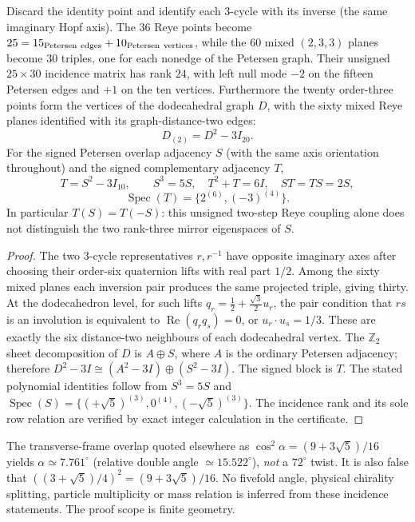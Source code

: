 \documentclass[11pt]{article}
\begin{document}
\begin{corollary}
\label{p1:cor:v340-reye-dodeca-second-neighbour}
Discard the identity point and identify each 3-cycle with its inverse
(the same imaginary Hopf axis). The 36 Reye points become
$25=15_{\rm Petersen\ edges}+10_{\rm Petersen\ vertices}$,
while the $60$ mixed $(2,3,3)$ planes become $30$ triples, one for
each nonedge of the Petersen graph. Their unsigned $25\times30$
incidence matrix has rank $24$, with left null mode $-2$ on the
fifteen Petersen edges and $+1$ on the ten vertices.
Furthermore the twenty order-three points form the vertices of the
dodecahedral graph $D$, with the sixty mixed Reye planes identified
with its graph-distance-two edges:
\[
 \boxed{D_{(2)}=D^2-3I_{20}.}
\]
For the signed Petersen overlap adjacency $S$ (with the same axis
orientation throughout) and the signed complementary adjacency $T$,
\[
 \boxed{T=S^2-3I_{10}},\qquad
 S^3=5S,\quad T^2+T=6I,\quad ST=TS=2S,
\]
\[
 \operatorname{Spec}(T)=\{2^{(6)},(-3)^{(4)}\}.
\]
In particular $T(S)=T(-S)$: this unsigned two-step Reye coupling
alone does not distinguish the two rank-three mirror eigenspaces of $S$.
\end{corollary}
\begin{proof}
The two 3-cycle representatives $r,r^{-1}$ have opposite imaginary
axes after choosing their order-six quaternion lifts with real part
$1/2$. Among the sixty mixed planes each inversion pair produces the
same projected triple, giving thirty. At the dodecahedron level,
for such lifts $q_r=\tfrac12+\tfrac{\sqrt3}{2}u_r$, the pair condition
that $rs$ is an involution is equivalent to
$\operatorname{Re}(q_rq_s)=0$, or $u_r\cdot u_s=1/3$.
These are exactly the six distance-two neighbours of each dodecahedral
vertex. The $\mathbb Z_2$ sheet decomposition of $D$ is $A\oplus S$,
where $A$ is the ordinary Petersen adjacency; therefore
$D^2-3I\cong(A^2-3I)\oplus(S^2-3I)$. The signed block is $T$.
The stated polynomial identities follow from $S^3=5S$ and
$\operatorname{Spec}(S)=\{(+\sqrt5)^{(3)},0^{(4)},(-\sqrt5)^{(3)}\}$.
The incidence rank and its sole row relation are verified by exact
integer calculation in the certificate.
\end{proof}

\begin{remark}
\label{p1:rem:v340-reye-angle-firewall}
The transverse-frame overlap quoted elsewhere as
$\cos^2\alpha=(9+3\sqrt5)/16$ yields
$\alpha\simeq7.761^\circ$ (relative double angle $\simeq15.522^\circ$),
\emph{not} a $72^\circ$ twist. It is also false that
$((3+\sqrt5)/4)^2=(9+3\sqrt5)/16$. No fivefold angle, physical
chirality splitting, particle multiplicity or mass relation is inferred
from these incidence statements. The proof scope is finite geometry.
\end{remark}
\end{document}
